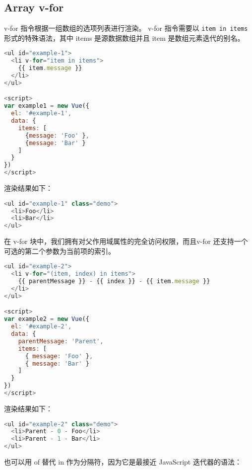 \begin{lstlisting}[language=JavaScript]

\end{lstlisting}




\subsection{Array v-for}

v-for 指令根据一组数组的选项列表进行渲染。 v-for 指令需要以 \texttt{item in items}形式的特殊语法，其中 items 是源数据数组并且 item 是数组元素迭代的别名。

\begin{lstlisting}[language=JavaScript]
<ul id="example-1">
  <li v-for="item in items">
    {{ item.message }}
  </li>
</ul>

<script>
var example1 = new Vue({
  el: '#example-1',
  data: {
    items: [
      {message: 'Foo' },
      {message: 'Bar' }
    ]
  }
})
</script>
\end{lstlisting}

渲染结果如下：


\begin{lstlisting}[language=JavaScript]
<ul id="example-1" class="demo">
  <li>Foo</li>
  <li>Bar</li>
</ul>
\end{lstlisting}


在 v-for 块中，我们拥有对父作用域属性的完全访问权限，而且v-for 还支持一个可选的第二个参数为当前项的索引。





\begin{lstlisting}[language=JavaScript]
<ul id="example-2">
  <li v-for="(item, index) in items">
    {{ parentMessage }} - {{ index }} - {{ item.message }}
  </li>
</ul>

<script>
var example2 = new Vue({
  el: '#example-2',
  data: {
    parentMessage: 'Parent',
    items: [
      { message: 'Foo' },
      { message: 'Bar' }
    ]
  }
})
</script>
\end{lstlisting}

渲染结果如下：

\begin{lstlisting}[language=JavaScript]
<ul id="example-2" class="demo">
  <li>Parent - 0 - Foo</li>
  <li>Parent - 1 - Bar</li>
</ul>
\end{lstlisting}

也可以用 of 替代 in 作为分隔符，因为它是最接近 JavaScript 迭代器的语法：

